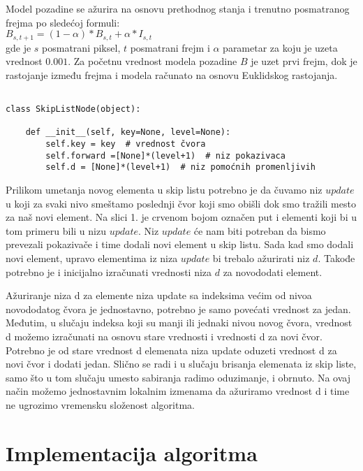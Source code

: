 \documentclass[a4paper]{article}
\begin{document}
Model pozadine se ažurira na osnovu prethodnog stanja i trenutno posmatranog frejma po sledećoj formuli: 
\\
$B_{s,t+1} = (1 - \alpha) * B_{s,t} + \alpha * I_{s,t}$
\\
gde je $s$ posmatrani piksel, $t$ posmatrani frejm i $\alpha$ parametar za koju je uzeta vrednost $0.001$. Za početnu vrednost modela pozadine $B$ je uzet prvi frejm, dok je rastojanje između frejma i modela računato na osnovu Euklidskog rastojanja.



\begin{verbatim}

class SkipListNode(object):

    def __init__(self, key=None, level=None):
        self.key = key  # vrednost čvora
        self.forward =[None]*(level+1)  # niz pokazivaca
        self.d = [None]*(level+1)  # niz pomoćnih promenljivih

\end{verbatim}

Prilikom umetanja novog elementa u skip listu potrebno je da čuvamo niz $update$ u koji za svaki nivo smeštamo poslednji čvor koji smo obišli dok smo tražili mesto za naš novi element. Na slici 1. je crvenom bojom označen put i elementi koji bi u tom primeru bili u nizu $update$. Niz $update$ će nam biti potreban da bismo prevezali pokazivače i time dodali novi element u skip listu. Sada kad smo dodali novi element, upravo elementima iz niza $update$ bi trebalo ažurirati niz $d$. Takođe potrebno je i inicijalno izračunati vrednosti niza $d$ za novododati element.

Ažuriranje niza d za elemente niza update sa indeksima većim od nivoa novododatog čvora je jednostavno, potrebno je samo povećati vrednost za jedan. Međutim, u slučaju indeksa koji su manji ili jednaki nivou novog čvora, vrednost d možemo izračunati na osnovu stare vrednosti i vrednosti d za novi čvor. Potrebno je od stare vrednost d elemenata niza update oduzeti vrednost d za novi čvor i dodati jedan. Slično se radi i u slučaju brisanja elemenata iz skip liste, samo što u tom slučaju umesto sabiranja radimo oduzimanje, i obrnuto. Na ovaj način možemo jednostavnim lokalnim izmenama da ažuriramo vrednost d i time ne ugrozimo vremensku složenost algoritma.

\section{Implementacija algoritma}
\label{sec:algoritam}
\end{document}
